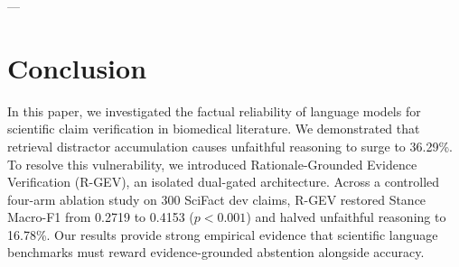 \documentclass[10pt,journal,compsoc]{IEEEtran}
\begin{document}
---

\section{Conclusion}
In this paper, we investigated the factual reliability of language models for scientific claim verification in biomedical literature. We demonstrated that retrieval distractor accumulation causes unfaithful reasoning to surge to 36.29\%. To resolve this vulnerability, we introduced Rationale-Grounded Evidence Verification (R-GEV), an isolated dual-gated architecture. Across a controlled four-arm ablation study on 300 SciFact dev claims, R-GEV restored Stance Macro-F1 from 0.2719 to 0.4153 ($p < 0.001$) and halved unfaithful reasoning to 16.78\%. Our results provide strong empirical evidence that scientific language benchmarks must reward evidence-grounded abstention alongside accuracy.



\end{document}

